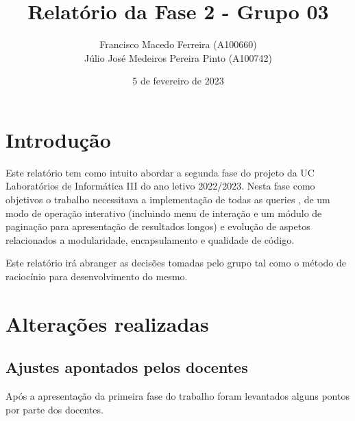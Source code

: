\documentclass{article}
\title{Relatório da Fase 2 - Grupo 03}
\author{Francisco Macedo Ferreira (A100660)\\Júlio José Medeiros Pereira Pinto (A100742)}
\date{5 de fevereiro de 2023}
\begin{document}
    \begin{titlingpage}
    \maketitle
    \end{titlingpage}

    \pagebreak
    \setcounter{tocdepth}{2}
    \tableofcontents
    
    \pagebreak
    
    \section{Introdução}
    Este relatório tem como intuito abordar a segunda fase do projeto da UC Laboratórios 
    de Informática III do ano letivo 2022/2023.
    Nesta fase como objetivos o trabalho necessitava a implementação de todas as queries
    , de um modo de operação interativo (incluindo menu de interação e um módulo de 
    paginação para apresentação de resultados longos) e evolução de aspetos relacionados
    a modularidade, encapsulamento e qualidade de código.
    
    Este relatório irá abranger as decisões tomadas pelo grupo tal como o método de 
    raciocínio para desenvolvimento do mesmo.
    
    \section{Alterações realizadas}
        \subsection{Ajustes apontados pelos docentes}
            Após a apresentação da primeira fase do trabalho foram levantados
            alguns pontos por parte dos docentes. 
\end{document}
